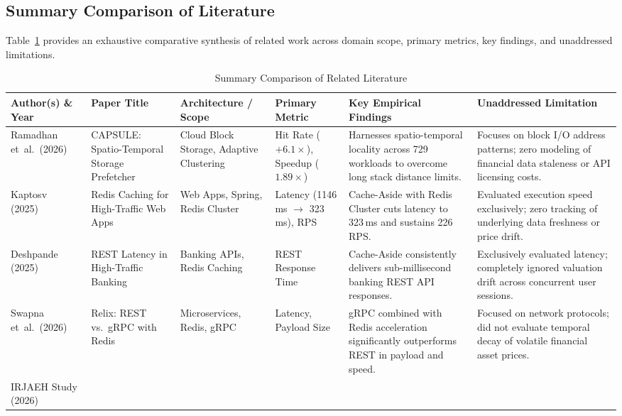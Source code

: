 \documentclass[11pt,a4paper]{article}
\begin{document}
\subsection{Summary Comparison of Literature}

Table~\ref{tab:related} provides an exhaustive comparative synthesis of related work across domain scope, primary metrics, key findings, and unaddressed limitations.

\begin{table}[htbp]
\centering
\caption{Summary Comparison of Related Literature}
\label{tab:related}
\small
\begin{tabularx}{\textwidth}{p{2.2cm} p{2.8cm} p{2.2cm} p{1.8cm} X X}
\toprule
\textbf{Author(s) \& Year} & \textbf{Paper Title} & \textbf{Architecture / Scope} & \textbf{Primary Metric} & \textbf{Key Empirical Findings} & \textbf{Unaddressed Limitation} \\
\midrule
Ramadhan et~al.\ (2026)~\cite{capsule2026}
  & CAPSULE: Spatio-Temporal Storage Prefetcher
  & Cloud Block Storage, Adaptive Clustering
  & Hit Rate ($+6.1\times$), Speedup ($1.89\times$)
  & Harnesses spatio-temporal locality across 729 workloads to overcome long stack distance limits.
  & Focuses on block I/O address patterns; zero modeling of financial data staleness or API licensing costs. \\
\addlinespace
Kaptosv (2025)~\cite{kaptosv2025}
  & Redis Caching for High-Traffic Web Apps
  & Web Apps, Spring, Redis Cluster
  & Latency (1146\,ms $\to$ 323\,ms), RPS
  & Cache-Aside with Redis Cluster cuts latency to 323\,ms and sustains 226\,RPS.
  & Evaluated execution speed exclusively; zero tracking of underlying data freshness or price drift. \\
\addlinespace
Deshpande (2025)~\cite{deshpande2025}
  & REST Latency in High-Traffic Banking
  & Banking APIs, Redis Caching
  & REST Response Time
  & Cache-Aside consistently delivers sub-millisecond banking REST API responses.
  & Exclusively evaluated latency; completely ignored valuation drift across concurrent user sessions. \\
\addlinespace
Swapna et~al.\ (2026)~\cite{swapna2026}
  & Relix: REST vs.\ gRPC with Redis
  & Microservices, Redis, gRPC
  & Latency, Payload Size
  & gRPC combined with Redis acceleration significantly outperforms REST in payload and speed.
  & Focused on network protocols; did not evaluate temporal decay of volatile financial asset prices. \\
\addlinespace
IRJAEH Study (2026)~\cite{irjaeh2026}

\end{tabularx}
\end{table}
\end{document}
